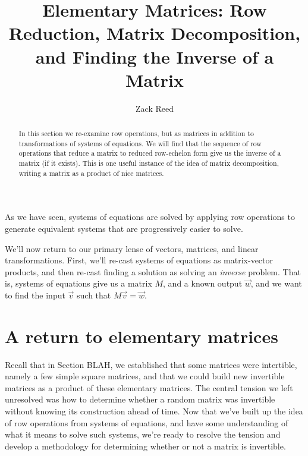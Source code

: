 \documentclass{ximera}
\author{Zack Reed}
\title{Elementary Matrices: Row Reduction, Matrix Decomposition, and Finding the Inverse of a Matrix}
\begin{document}
\begin{abstract}

    In this section we re-examine row operations, but as matrices in addition to transformations of systems of equations. We will find that the sequence of row operations that reduce a matrix to reduced row-echelon form give us the inverse of a matrix (if it exists). This is one useful instance of the idea of matrix decomposition, writing a matrix as a product of nice matrices.

\end{abstract}
\maketitle


As we have seen, systems of equations are solved by applying row operations to generate equivalent systems that are progressively easier to solve. 

We'll now return to our primary lense of vectors, matrices, and linear transformations. First, we'll re-cast systems of equations as matrix-vector products, and then re-cast finding a solution as solving an \emph{inverse} problem. That is, systems of equations give us a matrix $M$, and a known output $\vec{w}$, and we want to find the input $\vec{v}$ such that $M\vec{v} = \vec{w}$.
 
\section{A return to elementary matrices}

Recall that in Section BLAH, we established that some matrices were intertible, namely a few simple square matrices, and that we could build new invertible matrices as a product of these elementary matrices. The central tension we left unresolved was how to determine whether a random matrix was invertible without knowing its construction ahead of time. Now that we've built up the idea of row operations from systems of equations, and have some understanding of what it means to solve such systems, we're ready to resolve the tension and develop a methodology for determining whether or not a matrix is invertible.
\end{document}

